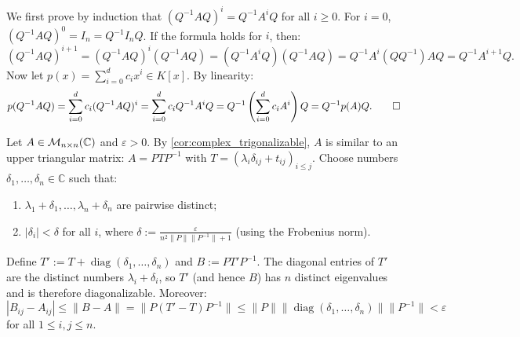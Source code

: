 \begin{exercisesolution}
\label{sol:similarity_of_matrix_polynomials}
We first prove by induction that $(Q^{-1} A Q)^i = Q^{-1} A^i Q$ for all $i \ge 0$.
For $i = 0$, $(Q^{-1} A Q)^0 = I_n = Q^{-1} I_n Q$. If the formula holds for $i$, then:
\[
(Q^{-1} A Q)^{i+1} = (Q^{-1} A Q)^i (Q^{-1} A Q) = (Q^{-1} A^i Q)(Q^{-1} A Q) = Q^{-1} A^i (Q Q^{-1}) A Q = Q^{-1} A^{i+1} Q.
\]
Now let $p(x) = \sum_{i=0}^d c_i x^i \in K[x]$. By linearity:
\[
p(Q^{-1} A Q) = \sum_{i=0}^d c_i (Q^{-1} A Q)^i = \sum_{i=0}^d c_i Q^{-1} A^i Q = Q^{-1} \left( \sum_{i=0}^d c_i A^i \right) Q = Q^{-1} p(A) Q. \qedhere
\]
\end{exercisesolution}

\begin{exercisesolution}
\label{sol:density_of_diagonalizable_matrices}
Let $A \in \mathcal{M}_{n \times n}(\mathbb{C})$ and $\varepsilon > 0$.
By \cref{cor:complex_trigonalizable}, $A$ is similar to an upper triangular matrix: $A = P T P^{-1}$ with $T = (\lambda_i \delta_{ij} + t_{ij})_{i \le j}$.
Choose numbers $\delta_1, \dots, \delta_n \in \mathbb{C}$ such that:
\begin{enumerate}[label=\textbf{(\roman*)}]
    \item $\lambda_1 + \delta_1, \dots, \lambda_n + \delta_n$ are pairwise distinct;
    \item $|\delta_i| < \delta$ for all $i$, where $\delta := \frac{\varepsilon}{n^2 \|P\| \|P^{-1}\| + 1}$ (using the Frobenius norm).
\end{enumerate}
Define $T' := T + \operatorname{diag}(\delta_1, \dots, \delta_n)$ and $B := P T' P^{-1}$.
The diagonal entries of $T'$ are the distinct numbers $\lambda_i + \delta_i$, so $T'$ (and hence $B$) has $n$ distinct eigenvalues and is therefore diagonalizable.
Moreover:
\[
|B_{ij} - A_{ij}| \le \|B - A\| = \|P (T' - T) P^{-1}\| \le \|P\| \|\operatorname{diag}(\delta_1, \dots, \delta_n)\| \|P^{-1}\| < \varepsilon
\]
for all $1 \le i, j \le n$.
\end{exercisesolution}

